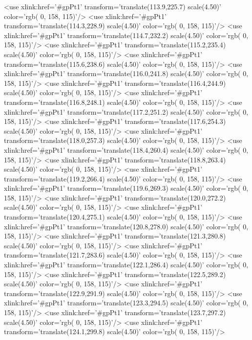 	<use xlink:href='#gpPt1' transform='translate(113.9,225.7) scale(4.50)' color='rgb(  0, 158, 115)'/>
	<use xlink:href='#gpPt1' transform='translate(114.3,228.9) scale(4.50)' color='rgb(  0, 158, 115)'/>
	<use xlink:href='#gpPt1' transform='translate(114.7,232.2) scale(4.50)' color='rgb(  0, 158, 115)'/>
	<use xlink:href='#gpPt1' transform='translate(115.2,235.4) scale(4.50)' color='rgb(  0, 158, 115)'/>
	<use xlink:href='#gpPt1' transform='translate(115.6,238.6) scale(4.50)' color='rgb(  0, 158, 115)'/>
	<use xlink:href='#gpPt1' transform='translate(116.0,241.8) scale(4.50)' color='rgb(  0, 158, 115)'/>
	<use xlink:href='#gpPt1' transform='translate(116.4,244.9) scale(4.50)' color='rgb(  0, 158, 115)'/>
	<use xlink:href='#gpPt1' transform='translate(116.8,248.1) scale(4.50)' color='rgb(  0, 158, 115)'/>
	<use xlink:href='#gpPt1' transform='translate(117.2,251.2) scale(4.50)' color='rgb(  0, 158, 115)'/>
	<use xlink:href='#gpPt1' transform='translate(117.6,254.3) scale(4.50)' color='rgb(  0, 158, 115)'/>
	<use xlink:href='#gpPt1' transform='translate(118.0,257.3) scale(4.50)' color='rgb(  0, 158, 115)'/>
	<use xlink:href='#gpPt1' transform='translate(118.4,260.4) scale(4.50)' color='rgb(  0, 158, 115)'/>
	<use xlink:href='#gpPt1' transform='translate(118.8,263.4) scale(4.50)' color='rgb(  0, 158, 115)'/>
	<use xlink:href='#gpPt1' transform='translate(119.2,266.4) scale(4.50)' color='rgb(  0, 158, 115)'/>
	<use xlink:href='#gpPt1' transform='translate(119.6,269.3) scale(4.50)' color='rgb(  0, 158, 115)'/>
	<use xlink:href='#gpPt1' transform='translate(120.0,272.2) scale(4.50)' color='rgb(  0, 158, 115)'/>
	<use xlink:href='#gpPt1' transform='translate(120.4,275.1) scale(4.50)' color='rgb(  0, 158, 115)'/>
	<use xlink:href='#gpPt1' transform='translate(120.8,278.0) scale(4.50)' color='rgb(  0, 158, 115)'/>
	<use xlink:href='#gpPt1' transform='translate(121.3,280.8) scale(4.50)' color='rgb(  0, 158, 115)'/>
	<use xlink:href='#gpPt1' transform='translate(121.7,283.6) scale(4.50)' color='rgb(  0, 158, 115)'/>
	<use xlink:href='#gpPt1' transform='translate(122.1,286.4) scale(4.50)' color='rgb(  0, 158, 115)'/>
	<use xlink:href='#gpPt1' transform='translate(122.5,289.2) scale(4.50)' color='rgb(  0, 158, 115)'/>
	<use xlink:href='#gpPt1' transform='translate(122.9,291.9) scale(4.50)' color='rgb(  0, 158, 115)'/>
	<use xlink:href='#gpPt1' transform='translate(123.3,294.5) scale(4.50)' color='rgb(  0, 158, 115)'/>
	<use xlink:href='#gpPt1' transform='translate(123.7,297.2) scale(4.50)' color='rgb(  0, 158, 115)'/>
	<use xlink:href='#gpPt1' transform='translate(124.1,299.8) scale(4.50)' color='rgb(  0, 158, 115)'/>
